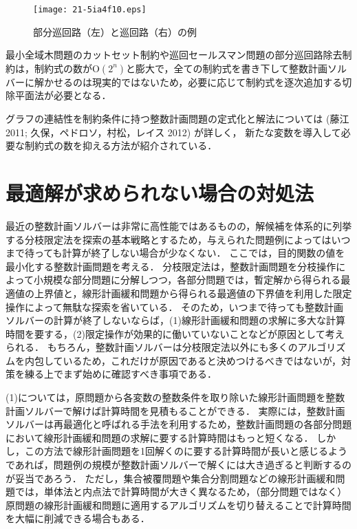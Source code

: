 \documentclass[japanese]{jnlp_1.4}
\begin{document}
\begin{figure}[t]
\begin{center}
\texttt{[image: 21-5ia4f10.eps]}
\end{center}
\caption{部分巡回路（左）と巡回路（右）の例}
\label{fig:subtour}
\end{figure}

最小全域木問題のカットセット制約や巡回セールスマン問題の部分巡回路除去制約は，制約式の数が$\mathrm{O}(2^n)$と膨大で，全ての制約式を書き下して整数計画ソルバーに解かせるのは現実的ではないため，必要に応じて制約式を逐次追加する切除平面法が必要となる．

    グラフの連結性を制約条件に持つ整数計画問題の定式化と解法については (藤江 2011; 久保，ペドロソ，村松，レイス 2012)\nocite{FujieT2011,KuboM2012} が詳しく，
新たな変数を導入して必要な制約式の数を抑える方法が紹介されている．


\section{最適解が求められない場合の対処法}
\label{sec:hard-problem}

最近の整数計画ソルバーは非常に高性能ではあるものの，解候補を体系的に列挙する分枝限定法を探索の基本戦略とするため，与えられた問題例によってはいつまで待っても計算が終了しない場合が少なくない．
ここでは，目的関数の値を最小化する整数計画問題を考える．
分枝限定法は，整数計画問題を分枝操作によって小規模な部分問題に分解しつつ，各部分問題では，暫定解から得られる最適値の上界値と，線形計画緩和問題から得られる最適値の下界値を利用した限定操作によって無駄な探索を省いている．
そのため，いつまで待っても整数計画ソルバーの計算が終了しないならば，(1)線形計画緩和問題の求解に多大な計算時間を要する，(2)限定操作が効果的に働いていないことなどが原因として考えられる．
もちろん，整数計画ソルバーは分枝限定法以外にも多くのアルゴリズムを内包しているため，これだけが原因であると決めつけるべきではないが，対策を練る上でまず始めに確認すべき事項である．

(1)については，原問題から各変数の整数条件を取り除いた線形計画問題を整数計画ソルバーで解けば計算時間を見積もることができる．
実際には，整数計画ソルバーは再最適化と呼ばれる手法を利用するため，整数計画問題の各部分問題において線形計画緩和問題の求解に要する計算時間はもっと短くなる．
しかし，この方法で線形計画問題を1回解くのに要する計算時間が長いと感じるようであれば，問題例の規模が整数計画ソルバーで解くには大き過ぎると判断するのが妥当であろう．
ただし，集合被覆問題や集合分割問題などの線形計画緩和問題では，単体法と内点法で計算時間が大きく異なるため，（部分問題ではなく）原問題の線形計画緩和問題に適用するアルゴリズムを切り替えることで計算時間を大幅に削減できる場合もある．
\end{document}
